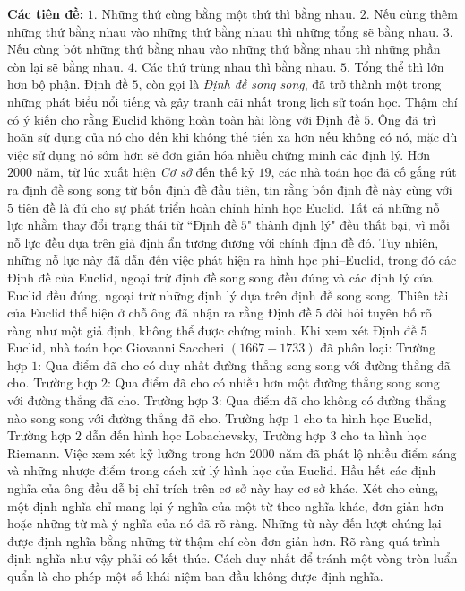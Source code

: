 \begin{multicols}{2}
	\vskip 0.1cm
	\textbf{\color{lichsutoanhoc}Các tiên đề:}
	\vskip 0.1cm
	$1.$ Những thứ cùng bằng một thứ thì bằng nhau.
	\vskip 0.1cm
	$2.$ Nếu cùng thêm những thứ bằng nhau vào những thứ bằng nhau thì những tổng sẽ bằng nhau.
	\vskip 0.1cm
	$3.$ Nếu cùng bớt những thứ bằng nhau vào những thứ bằng nhau thì những phần còn lại sẽ bằng nhau.
	\vskip 0.1cm
	$4.$ Các thứ trùng nhau thì bằng nhau.
	\vskip 0.1cm
	$5.$ Tổng thể thì lớn hơn bộ phận.
	\vskip 0.1cm
	Định đề $5$, còn gọi là \textit{Định đề song song}, đã trở thành một trong những phát biểu nổi tiếng và gây tranh cãi nhất trong lịch sử toán học. Thậm chí có ý kiến cho rằng Euclid không hoàn toàn hài lòng với Định đề $5$. Ông đã trì hoãn sử dụng của nó cho đến khi không thế tiến xa hơn nếu không có nó, mặc dù việc sử dụng nó sớm hơn sẽ đơn giản hóa nhiều chứng minh các định lý.
	\vskip 0.1cm
	Hơn $2000$ năm, từ lúc xuất hiện \textit{Cơ sở} đến thế kỷ $19$, các nhà toán học đã cố gắng rút ra định đề song song từ bốn định đề đầu tiên, tin rằng bốn định đề này cùng với $5$ tiên đề là đủ cho sự phát triển hoàn chỉnh hình học Euclid. Tất cả những nỗ lực nhằm thay đổi trạng thái từ ``Định đề $5$" thành định lý" đều thất bại, vì mỗi nỗ lực đều dựa trên giả định ẩn tương đương với chính định đề đó. 
	\vskip 0.1cm
	Tuy nhiên, những nỗ lực này đã dẫn đến việc phát hiện ra hình học phi--Euclid, trong đó các Định đề của Euclid, ngoại trừ định đề song song đều đúng và các định lý của Euclid đều đúng, ngoại trừ những định lý dựa trên định đề song song. Thiên tài của Euclid thể hiện ở chỗ ông đã nhận ra rằng Định đề $5$ đòi hỏi tuyên bố rõ ràng như một giả định, không thể được chứng minh.   
	\vskip 0.1cm
	Khi xem xét Định đề $5$ Euclid, nhà toán học Giovanni Saccheri $(1667-1733)$ đã phân loại:
	\vskip 0.1cm
	Trường hợp $1$: Qua điểm đã cho có duy nhất đường thẳng song song với đường thẳng đã cho.
	\vskip 0.1cm
	Trường hợp $2$: Qua điểm đã cho có nhiều hơn một đường thẳng song song với đường thẳng đã cho.
	\vskip 0.1cm
	Trường hợp $3$: Qua điểm đã cho không có đường thẳng nào song song với đường thẳng đã cho.
	\vskip 0.1cm
	Trường hợp $1$ cho ta hình học Euclid, Trường hợp $2$ dẫn đến hình học Lobachevsky, Trường hợp $3$ cho ta hình học Riemann.
	\vskip 0.1cm
	Việc xem xét kỹ lưỡng trong hơn $2000$ năm đã phát lộ nhiều điểm sáng và những nhược điểm trong cách xử lý hình học của Euclid. Hầu hết các định nghĩa của ông đều dễ bị chỉ trích trên cơ sở này hay cơ sở khác. Xét cho cùng, một định nghĩa chỉ mang lại ý nghĩa của một từ theo nghĩa khác, đơn giản hơn--hoặc những từ mà ý nghĩa của nó đã rõ ràng. Những từ này đến lượt chúng lại được định nghĩa bằng những từ thậm chí còn đơn giản hơn. Rõ ràng quá trình định nghĩa như vậy phải có kết thúc. Cách duy nhất để tránh một vòng tròn luẩn quẩn là cho phép một số khái niệm ban đầu không được định nghĩa.

\end{multicols}
